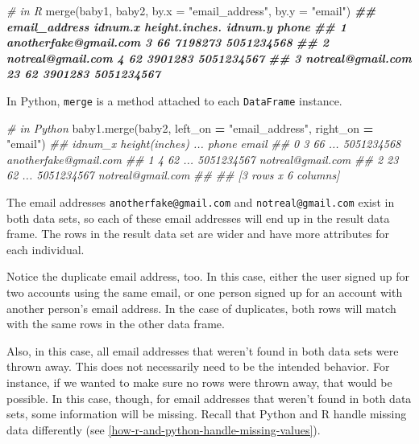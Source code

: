 \documentclass[
  12pt,
]{krantz}
\makeatletter
\newenvironment{Shaded}{\begin{snugshade}}{\end{snugshade}}
\newcommand{\AttributeTok}[1]{\textcolor[rgb]{0.61,0.61,0.61}{#1}}
\newcommand{\CommentTok}[1]{\textcolor[rgb]{0.37,0.37,0.37}{\textit{#1}}}
\newcommand{\DocumentationTok}[1]{\textcolor[rgb]{0.37,0.37,0.37}{\textbf{\textit{#1}}}}
\newcommand{\FunctionTok}[1]{\textcolor[rgb]{0,0,0}{#1}}
\newcommand{\NormalTok}[1]{#1}
\newcommand{\OperatorTok}[1]{\textcolor[rgb]{0.43,0.43,0.43}{\textbf{#1}}}
\newcommand{\StringTok}[1]{\textcolor[rgb]{0.5,0.5,0.5}{#1}}
\newenvironment{kframe}{%
\medskip{}
\setlength{\fboxsep}{.8em}
 \def\at@end@of@kframe{}%
 \ifinner\ifhmode%
  \def\at@end@of@kframe{\end{minipage}}%
  \begin{minipage}{\columnwidth}%
 \fi\fi%
 \def\FrameCommand##1{\hskip\@totalleftmargin \hskip-\fboxsep
 \colorbox{shadecolor}{##1}\hskip-\fboxsep
     \hskip-\linewidth \hskip-\@totalleftmargin \hskip\columnwidth}%
 \MakeFramed {\advance\hsize-\width
   \@totalleftmargin\z@ \linewidth\hsize
   \@setminipage}}%
 {\par\unskip\endMakeFramed%
 \at@end@of@kframe}
\renewenvironment{Shaded}{\begin{kframe}}{\end{kframe}}
\makeatother
\begin{document}
\begin{Shaded}
\begin{Highlighting}[]
\CommentTok{\# in R}
\FunctionTok{merge}\NormalTok{(baby1, baby2, }\AttributeTok{by.x =} \StringTok{"email\_address"}\NormalTok{, }\AttributeTok{by.y =} \StringTok{"email"}\NormalTok{)}
\DocumentationTok{\#\#           email\_address idnum.x height.inches. idnum.y      phone}
\DocumentationTok{\#\# 1 anotherfake@gmail.com       3             66 7198273 5051234568}
\DocumentationTok{\#\# 2     notreal@gmail.com       4             62 3901283 5051234567}
\DocumentationTok{\#\# 3     notreal@gmail.com      23             62 3901283 5051234567}
\end{Highlighting}
\end{Shaded}

In Python, \texttt{merge} is a method attached to each \texttt{DataFrame} instance.

\begin{Shaded}
\begin{Highlighting}[]
\CommentTok{\# in Python}
\NormalTok{baby1.merge(baby2, left\_on }\OperatorTok{=} \StringTok{"email\_address"}\NormalTok{, right\_on }\OperatorTok{=} \StringTok{"email"}\NormalTok{)}
\CommentTok{\#\#    idnum\_x  height(inches)  ...       phone                  email}
\CommentTok{\#\# 0        3              66  ...  5051234568  anotherfake@gmail.com}
\CommentTok{\#\# 1        4              62  ...  5051234567      notreal@gmail.com}
\CommentTok{\#\# 2       23              62  ...  5051234567      notreal@gmail.com}
\CommentTok{\#\# }
\CommentTok{\#\# [3 rows x 6 columns]}
\end{Highlighting}
\end{Shaded}

The email addresses \texttt{anotherfake@gmail.com} and \texttt{notreal@gmail.com} exist in both data sets, so each of these email addresses will end up in the result data frame. The rows in the result data set are wider and have more attributes for each individual.

Notice the duplicate email address, too. In this case, either the user signed up for two accounts using the same email, or one person signed up for an account with another person's email address. In the case of duplicates, both rows will match with the same rows in the other data frame.

Also, in this case, all email addresses that weren't found in both data sets were thrown away. This does not necessarily need to be the intended behavior. For instance, if we wanted to make sure no rows were thrown away, that would be possible. In this case, though, for email addresses that weren't found in both data sets, some information will be missing. Recall that Python and R handle missing data differently (see \ref{how-r-and-python-handle-missing-values}).
\end{document}
